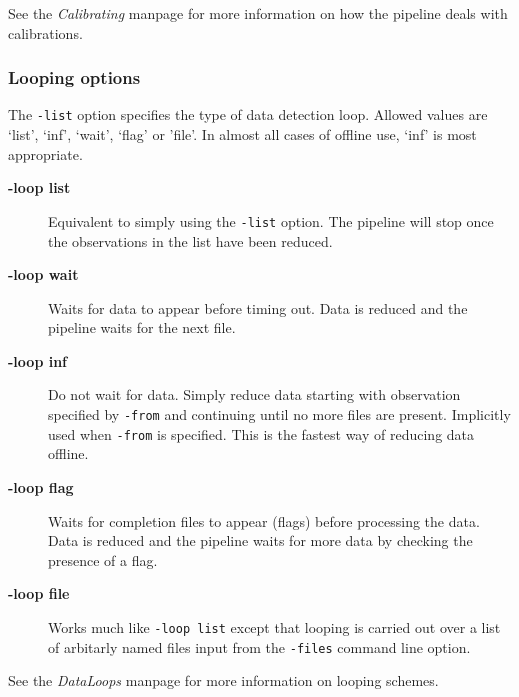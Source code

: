 \documentclass[twoside,11pt]{article}
\renewcommand{\_}{\texttt{\symbol{95}}}
\begin{document}
See the \emph{Calibrating} manpage for more information on how the pipeline deals
with calibrations.

\subsubsection*{Looping options\label{oracdr_Looping_options}}

The \texttt{-list} option specifies the type of data detection loop. Allowed
values are `list', `inf', `wait', `flag' or 'file'. In almost all cases of
offline use, `inf' is most appropriate.

\begin{description}
\item[\textbf{-loop list}] \mbox{}

Equivalent to simply using the \texttt{-list} option. The pipeline will stop
once the observations in the list have been reduced.

\item[\textbf{-loop wait}] \mbox{}

Waits for data to appear before timing out. Data is reduced and the pipeline
waits for the next file.

\item[\textbf{-loop inf}] \mbox{}

Do not wait for data. Simply reduce data starting with observation
specified by \texttt{-from} and continuing until no more files are present.
Implicitly used when \texttt{-from} is specified. This is the fastest way
of reducing data offline.

\item[\textbf{-loop flag}] \mbox{}

Waits for completion files to appear (flags) before processing the data.
Data is reduced and the pipeline waits for more data by checking the
presence of a flag.

\item[\textbf{-loop file}] \mbox{}

Works much like \texttt{-loop list} except that looping is carried out over a
list of arbitarly named files input from the \texttt{-files} command line option.

\end{description}


See the \emph{DataLoops} manpage for more
information on looping schemes.
\end{document}
